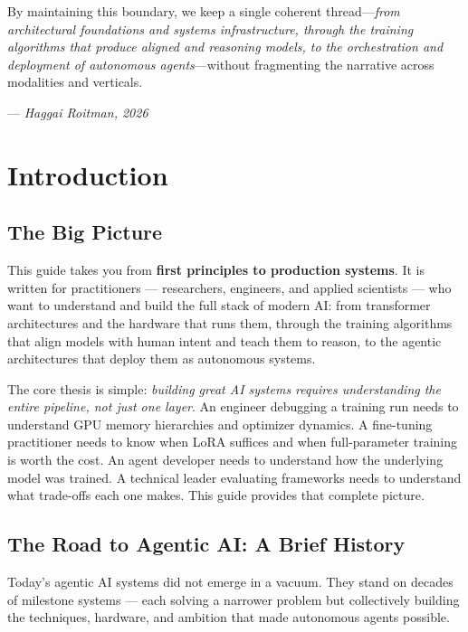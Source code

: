 \documentclass[11pt,a4paper,openany]{book}
\begin{document}
By maintaining this boundary, we keep a single coherent thread---\emph{from architectural foundations and systems infrastructure, through the training algorithms that produce aligned and reasoning models, to the orchestration and deployment of autonomous agents}---without fragmenting the narrative across modalities and verticals.

--- \emph{Haggai Roitman, 2026}

\chapter*{Introduction}
\label{introduction}

\section*{The Big Picture}
\label{the-big-picture}

This guide takes you from \textbf{first principles to production systems}. It is written for practitioners --- researchers, engineers, and applied scientists --- who want to understand and build the full stack of modern AI: from transformer architectures and the hardware that runs them, through the training algorithms that align models with human intent and teach them to reason, to the agentic architectures that deploy them as autonomous systems.

The core thesis is simple: \emph{building great AI systems requires understanding the entire pipeline, not just one layer}. An engineer debugging a training run needs to understand GPU memory hierarchies and optimizer dynamics. A fine-tuning practitioner needs to know when LoRA suffices and when full-parameter training is worth the cost. An agent developer needs to understand how the underlying model was trained. A technical leader evaluating frameworks needs to understand what trade-offs each one makes. This guide provides that complete picture.

\section*{The Road to Agentic AI: A Brief History}
\label{the-road-to-agentic-ai-a-brief-history}

Today’s agentic AI systems did not emerge in a vacuum. They stand on decades of milestone systems --- each solving a narrower problem but collectively building the techniques, hardware, and ambition that made autonomous agents possible.
\end{document}
